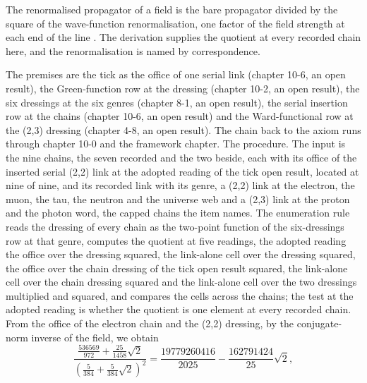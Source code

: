 \begin{chbridge}
The renormalised propagator of a field is the bare propagator divided by the square of the wave-function renormalisation, one factor of the field strength at each end of the line \cite{Dyson1949,LSZ1955}. The derivation supplies the quotient at every recorded chain here, and the renormalisation is named by correspondence.
\end{chbridge}
\begin{chproof}
The premises are the tick as the office of one serial link (chapter 10-6, an open result), the Green-function row at the dressing (chapter 10-2, an open result), the six dressings at the six genres (chapter 8-1, an open result), the serial insertion row at the chains (chapter 10-6, an open result) and the Ward-functional row at the (2,3) dressing (chapter 4-8, an open result). The chain back to the axiom runs through chapter 10-0 and the framework chapter. The procedure. The input is the nine chains, the seven recorded and the two beside, each with its office of the inserted serial (2,2) link at the adopted reading of the tick open result, located at nine of nine, and its recorded link with its genre, a (2,2) link at the electron, the muon, the tau, the neutron and the universe web and a (2,3) link at the proton and the photon word, the capped chains the item names. The enumeration rule reads the dressing of every chain as the two-point function of the six-dressings row at that genre, computes the quotient at five readings, the adopted reading the office over the dressing squared, the link-alone cell over the dressing squared, the office over the chain dressing of the tick open result squared, the link-alone cell over the chain dressing squared and the link-alone cell over the two dressings multiplied and squared, and compares the cells across the chains; the test at the adopted reading is whether the quotient is one element at every recorded chain. From the office of the electron chain and the (2,2) dressing, by the conjugate-norm inverse of the field, we obtain
\begin{equation}
\frac{\tfrac{536569}{972} + \tfrac{25}{1458}\sqrt{2}}{\left(\tfrac{5}{384} + \tfrac{5}{384}\sqrt{2}\right)^{2}} = \frac{19779260416}{2025} - \frac{162791424}{25}\sqrt{2} ,
\end{equation}

\end{chproof}
